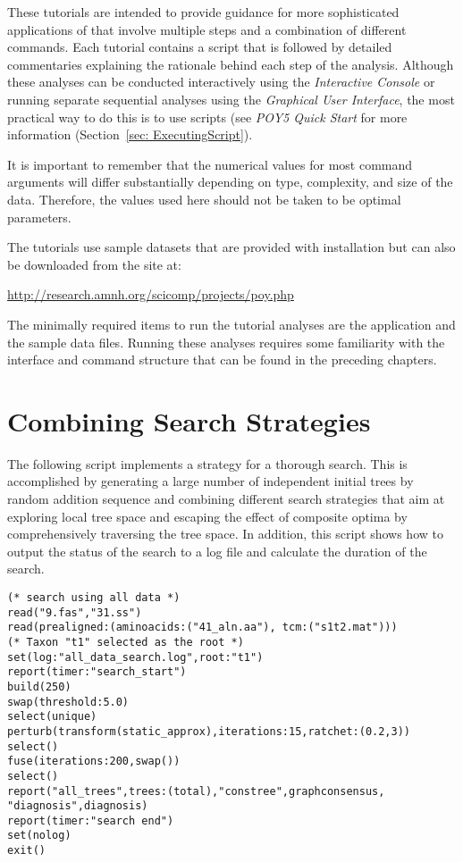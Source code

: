 These tutorials are intended to provide guidance for more sophisticated applications of \poy that involve 
multiple steps and a combination of different commands. Each tutorial contains a \poy script that is followed 
by detailed commentaries explaining the rationale behind each step of the analysis. Although these analyses 
can be conducted interactively using the \emph{Interactive Console} or running separate sequential analyses
 using the \emph{Graphical User Interface}, the most practical way to do this is to use \poy scripts (see 
 \emph{ POY5 Quick Start} for more information (Section~\ref{sec: ExecutingScript}).\\


\begin{statement}
It is important to remember that the numerical values for most command arguments will differ substantially 
depending on type, complexity, and size of the data. Therefore, the values used here should not be taken to be 
optimal parameters.
\end{statement}

\indent The tutorials use sample datasets that are provided with \poy installation but can also be downloaded from 
the \poy site at:
\begin{center}
\url{http://research.amnh.org/scicomp/projects/poy.php}
\end{center}
The minimally required items to run the tutorial analyses are the \poy application and the sample data files. 
Running these analyses requires some familiarity with the \poy interface and command structure that can be 
found in the preceding chapters.


\section{Combining Search Strategies}{\label{tutorial1}}

The following script implements a strategy for a thorough search. This is accomplished by generating a large 
number of independent initial trees by random addition sequence and combining different search strategies 
that aim at exploring local tree space and escaping the effect of composite optima by comprehensively 
traversing the tree space. In addition, this script shows how to output the status of the search to a log file and
 calculate the duration of the search. 

\begin{verbatim}
(* search using all data *)
read("9.fas","31.ss")
read(prealigned:(aminoacids:("41_aln.aa"), tcm:("s1t2.mat")))
(* Taxon "t1" selected as the root *)
set(log:"all_data_search.log",root:"t1")
report(timer:"search_start")
build(250)
swap(threshold:5.0)
select(unique)
perturb(transform(static_approx),iterations:15,ratchet:(0.2,3))
select()
fuse(iterations:200,swap())
select()
report("all_trees",trees:(total),"constree",graphconsensus,
"diagnosis",diagnosis)
report(timer:"search end")
set(nolog)
exit()
\end{verbatim}

